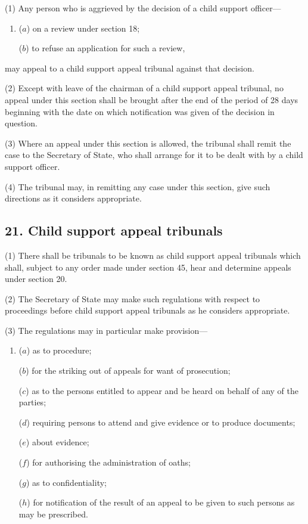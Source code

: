 \documentclass[12pt,a4paper]{article}
\begin{document}
(1) Any person who is aggrieved by the decision of a child support officer—
\begin{enumerate}\item[]
($a$) on a review under section 18;

($b$) to refuse an application for such a review,
\end{enumerate}
may appeal to a child support appeal tribunal against that decision.

(2) Except with leave of the chairman of a child support appeal tribunal, no appeal under this section shall be brought after the end of the period of 28 days beginning with the date on which notification was given of the decision in question.

(3) Where an appeal under this section is allowed, the tribunal shall remit the case to the Secretary of State, who shall arrange for it to be dealt with by a child support officer.

(4) The tribunal may, in remitting any case under this section, give such directions as it considers appropriate.


\subsection{21. Child support appeal tribunals}

(1) There shall be tribunals to be known as child support appeal tribunals which shall, subject to any order made under section 45, hear and determine appeals under section 20.

(2) The Secretary of State may make such regulations with respect to proceedings before child support appeal tribunals as he considers appropriate.

(3) The regulations may in particular make provision—
\begin{enumerate}\item[]
($a$) as to procedure;

($b$) for the striking out of appeals for want of prosecution;

($c$) as to the persons entitled to appear and be heard on behalf of any of the parties;

($d$) requiring persons to attend and give evidence or to produce documents;

($e$) about evidence;

($f$) for authorising the administration of oaths;

($g$) as to confidentiality;

($h$) for notification of the result of an appeal to be given to such persons as may be prescribed.
\end{enumerate}
\end{document}
